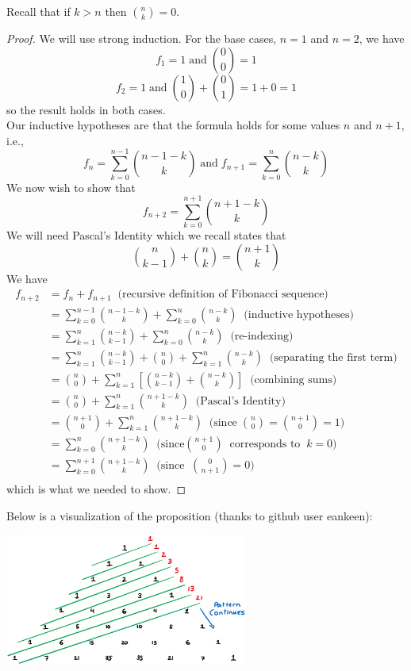 \documentclass[handout]{ximera}
\begin{document}
\begin{remark}
Recall that if $k>n$ then $\binom{n}{k} = 0$.
\end{remark}

\begin{proof}
We will use strong induction. For the base cases, $n=1$ and $n=2$, we have
\[
f_1 =1  \; \text{and} \; \binom{0}{0} = 1 
\]
\[
f_2 =  1 \; \text{and} \; 
\binom{1}{0} + \binom{0}{1} = 1 + 0 = 1
\]
so the result holds in both cases.\\
Our inductive hypotheses are that the formula holds for some values $n$ and $n+1$, i.e., 
\[
f_n = \sum_{k=0}^{n-1} \binom{n-1-k}{k}  \;\text{and}\; f_{n+1} = \sum_{k=0}^{n} \binom{n-k}{k}
\]
We now wish to show that
\[
f_{n+2} = \sum_{k=0}^{n+1} \binom{n+1-k}{k}
\]
We will need Pascal's Identity  which we recall states that
\[
 \binom{n}{k-1}+ \binom{n}{k}=\binom{n+1}{k}
\]
We have
\begin{align*}
f_{n+2} &= f_n + f_{n+1}\;\; \text{(recursive definition of Fibonacci sequence)}\\
        &= \sum_{k=0}^{n-1} \binom{n-1-k}{k}  + \sum_{k=0}^{n} \binom{n-k}{k} \;\;\text{(inductive hypotheses)}\\
        &= \sum_{k=1}^{n} \binom{n-k}{k-1}  + \sum_{k=0}^{n} \binom{n-k}{k} \;\;\text{(re-indexing)}\\
        &= \sum_{k=1}^{n} \binom{n-k}{k-1}  + \binom{n}{0} + \sum_{k=1}^{n} \binom{n-k}{k} \;\;\text{(separating the first term)}\\
        &= \binom{n}{0} + \sum_{k=1}^{n} \left[\binom{n-k}{k-1} + \binom{n-k}{k} \right] \;\;\text{(combining sums)}\\
        &= \binom{n}{0} + \sum_{k=1}^{n} \binom{n+1-k}{k} \;\;\text{(Pascal's Identity)}\\
        &= \binom{n+1}{0} + \sum_{k=1}^{n} \binom{n+1-k}{k} \;\;\text{(since} \;\binom{n}{0} = \binom{n+1}{0} = 1)\\
         &= \sum_{k=0}^{n} \binom{n+1-k}{k}\;\;\text{(since} \binom{n+1}{0} \;\; \text{corresponds to} \;\; k = 0) \\
         &= \sum_{k=0}^{n+1} \binom{n+1-k}{k} \;\;\text{(since} \;\; \binom{0}{n+1} = 0)\\
\end{align*} 
which is what we needed to show.
\end{proof}
Below is a visualization of the proposition (thanks to github user eankeen):
\begin{image}
\includegraphics[width=0.6\textwidth]{pascalfibonacci}
\end{image}
\end{document}
